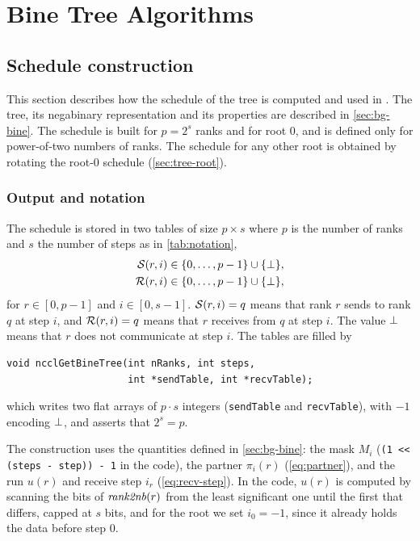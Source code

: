 \chapter{Bine Tree Algorithms}\label{ch:tree}

\section{Schedule construction}\label{sec:tree-impl}

This section describes how the schedule of the \bine{} tree is computed and used in \nccl{}.
The \bine{} tree, its negabinary representation and its properties are described in \cref{sec:bg-bine}.
The schedule is built for $p=2^s$ ranks and for root $0$, and is defined only for power-of-two numbers of ranks.
The schedule for any other root is obtained by rotating the root-$0$ schedule (\cref{sec:tree-root}).

\subsection{Output and notation}

The schedule is stored in two tables of size $p\times s$ where $p$ is the number of ranks and $s$ the number of steps as in \cref{tab:notation},
\begin{align}
  \mathcal{S}(r,i) &\in \{0,\dots,p-1\}\cup\{\bot\}, \\
  \mathcal{R}(r,i) &\in \{0,\dots,p-1\}\cup\{\bot\},
\end{align}
for $r\in[0,p-1]$ and $i\in[0,s-1]$.
$\mathcal{S}(r,i)=q$ means that rank $r$ sends to rank $q$ at step $i$, and $\mathcal{R}(r,i)=q$ means that $r$ receives from $q$ at step $i$.
The value $\bot$ means that $r$ does not communicate at step $i$.
The tables are filled by
\begin{verbatim}
void ncclGetBineTree(int nRanks, int steps,
                     int *sendTable, int *recvTable);
\end{verbatim}
which writes two flat arrays of $p\cdot s$ integers (\texttt{sendTable} and \texttt{recvTable}), with $-1$ encoding $\bot$, and asserts that $2^s=p$.

The construction uses the quantities defined in \cref{sec:bg-bine}: the mask $M_i$ (\texttt{(1 << (steps - step)) - 1} in the code), the partner $\pi_i(r)$ (\cref{eq:partner}), and the run $u(r)$ and receive step $i_r$ (\cref{eq:recv-step}).
In the code, $u(r)$ is computed by scanning the bits of $\mathit{rank2nb}(r)$ from the least significant one until the first that differs, capped at $s$ bits, and for the root we set $i_0=-1$, since it already holds the data before step $0$.

